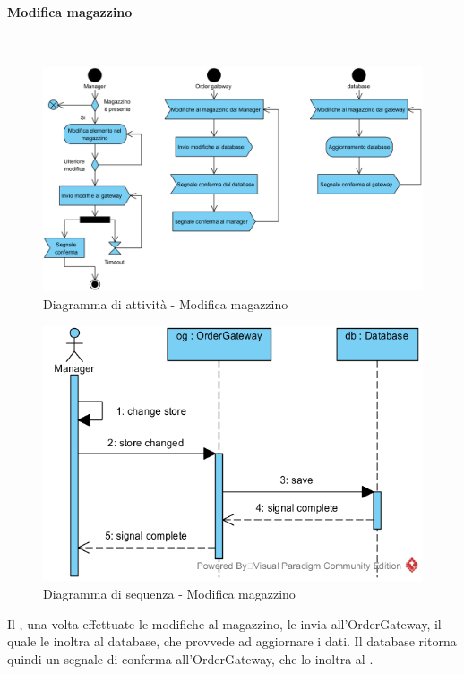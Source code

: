 \begin{samepage}
\paragraph{Modifica magazzino}\mbox{}\\
\begin{figure}[H]
	\centering
	\includegraphics[width=14cm]{diagrammi_img/attivita/manager_mag_modifiche.png}
	\caption{Diagramma di attività - Modifica magazzino}
\end{figure}
\end{samepage}
\begin{figure}[H]
	\centering
	\includegraphics[width=14cm]{../../documenti/SpecificaTecnica/diagrammi_img/sequenza/direttore_modifica_magazzino.png}
	\caption{Diagramma di sequenza - Modifica magazzino}
\end{figure}
Il \Manager{}, una volta effettuate le modifiche al magazzino, le invia all'Order\-Gateway, il quale le inoltra al database, che provvede ad aggiornare i dati. Il database ritorna quindi un segnale di conferma all'Order\-Gateway, che lo inoltra al \Manager{}.

